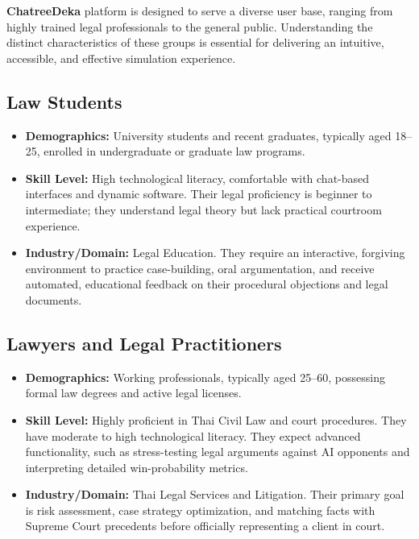 \textbf{ChatreeDeka} platform is designed to serve a diverse user base, ranging from highly trained legal professionals to the general public. Understanding the distinct characteristics of these groups is essential for delivering an intuitive, accessible, and effective simulation experience.

\subsection{Law Students}
\begin{itemize}
    \item \textbf{Demographics:} University students and recent graduates, typically aged 18--25, enrolled in undergraduate or graduate law programs.
    \item \textbf{Skill Level:} High technological literacy, comfortable with chat-based interfaces and dynamic software. Their legal proficiency is beginner to intermediate; they understand legal theory but lack practical courtroom experience. 
    \item \textbf{Industry/Domain:} Legal Education. They require an interactive, forgiving environment to practice case-building, oral argumentation, and receive automated, educational feedback on their procedural objections and legal documents.
\end{itemize}

\subsection{Lawyers and Legal Practitioners}
\begin{itemize}
    \item \textbf{Demographics:} Working professionals, typically aged 25--60, possessing formal law degrees and active legal licenses.
    \item \textbf{Skill Level:} Highly proficient in Thai Civil Law and court procedures. They have moderate to high technological literacy. They expect advanced functionality, such as stress-testing legal arguments against AI opponents and interpreting detailed win-probability metrics.
    \item \textbf{Industry/Domain:} Thai Legal Services and Litigation. Their primary goal is risk assessment, case strategy optimization, and matching facts with Supreme Court precedents before officially representing a client in court.
\end{itemize}

